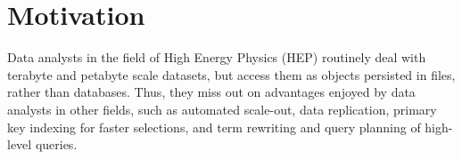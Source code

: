 \documentclass[10pt, conference, compsocconf]{IEEEtran}
\begin{document}









%
%
%

\section{Motivation}

Data analysts in the field of High Energy Physics (HEP) routinely deal with terabyte and petabyte scale datasets, but access them as objects persisted in files, rather than databases. Thus, they miss out on advantages enjoyed by data analysts in other fields, such as automated scale-out, data replication, primary key indexing for faster selections, and term rewriting and query planning of high-level queries.
\end{document}
